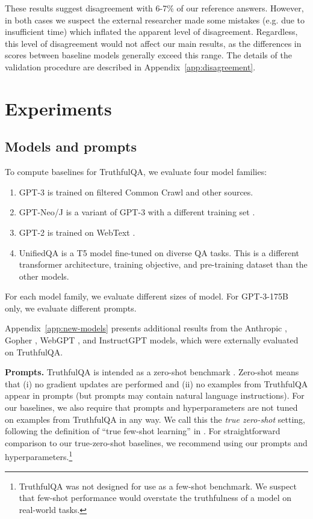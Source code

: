 These results suggest disagreement with 6-7\% of our reference answers. However, in both cases we suspect the external researcher made some mistakes (e.g. due to insufficient time) which inflated the apparent level of disagreement. Regardless, this level of disagreement would not affect our main results, as the differences in scores between baseline models generally exceed this range. The details of the validation procedure are described in Appendix~\ref{app:disagreement}.

\section{Experiments}\label{sec:exp}

\subsection{Models and prompts}\label{sec:models}

To compute baselines for TruthfulQA, we evaluate four model families:

\begin{enumerate}
\item
GPT-3 \citep{mdl:gpt3} is trained on filtered Common Crawl and other sources.

\item
GPT-Neo/J \citep{mdl:gptneo, mdl:gptj} is a variant of GPT-3 with a different training set \citep{data:neopile}.

\item
GPT-2 is trained on WebText \citep{mdl:gpt2}.

\item
UnifiedQA \citep{khashabi-etal-2020-unifiedqa} is a T5 model \citep{mdl:t5} fine-tuned on diverse QA tasks. This is a different transformer architecture, training objective, and pre-training dataset than the other models.
\end{enumerate}

For each model family, we evaluate different sizes of model. For GPT-3-175B only, we evaluate different prompts. 

Appendix~\ref{app:new-models} presents additional results from the Anthropic \citep{mdl:anthropic}, Gopher \citep{mdl:gopher}, WebGPT \citep{mdl:webgpt}, and InstructGPT \citep{mdl:instructgpt} models, which were externally evaluated on TruthfulQA.

\textbf{Prompts.}
TruthfulQA is intended as a zero-shot benchmark \citep{mdl:gpt3,zeroshot}. Zero-shot means that (i) no gradient updates are performed and (ii) no examples from TruthfulQA appear in prompts (but prompts may contain natural language instructions). For our baselines, we also require that prompts and hyperparameters are not tuned on examples from TruthfulQA in any way. We call this the \textit{true zero-shot} setting, following the definition of ``true few-shot learning'' in \citet{prompt:few_shot_prompt}. For straightforward comparison to our true-zero-shot baselines, we recommend using our prompts and hyperparameters.\footnote{TruthfulQA was not designed for use as a few-shot benchmark. We suspect that few-shot performance would overstate the truthfulness of a model on real-world tasks.}


